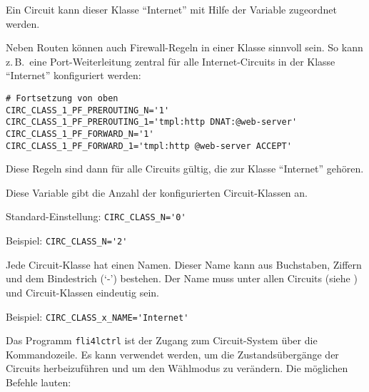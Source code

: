 Ein Circuit kann dieser Klasse ``Internet'' mit Hilfe der Variable
 zugeordnet werden.

Neben Routen können auch Firewall-Regeln in einer Klasse sinnvoll sein. So kann
z.\,B.\ eine Port-Weiterleitung zentral für alle Internet-Circuits in der
Klasse ``Internet'' konfiguriert werden:

\begin{example}
\begin{verbatim}
# Fortsetzung von oben
CIRC_CLASS_1_PF_PREROUTING_N='1'
CIRC_CLASS_1_PF_PREROUTING_1='tmpl:http DNAT:@web-server'
CIRC_CLASS_1_PF_FORWARD_N='1'
CIRC_CLASS_1_PF_FORWARD_1='tmpl:http @web-server ACCEPT'
\end{verbatim}
\end{example}

Diese Regeln sind dann für alle Circuits gültig, die zur Klasse ``Internet''
gehören.

\begin{description}


Diese Variable gibt die Anzahl der konfigurierten Circuit-Klassen an.

Standard-Einstellung: \verb+CIRC_CLASS_N='0'+

Beispiel: \verb+CIRC_CLASS_N='2'+


Jede Circuit-Klasse hat einen Namen. Dieser Name kann aus Buchstaben, Ziffern
und dem Bindestrich (`-') bestehen. Der Name muss unter allen Circuits
(siehe ) und Circuit-Klassen eindeutig
sein.

Beispiel: \verb+CIRC_CLASS_x_NAME='Internet'+

\end{description}


Das Programm \texttt{fli4lctrl} ist der Zugang zum Circuit-System über die
Kommandozeile. Es kann verwendet werden, um die Zustandsübergänge der Circuits
herbeizuführen und um den Wählmodus zu verändern. Die möglichen Befehle lauten:

